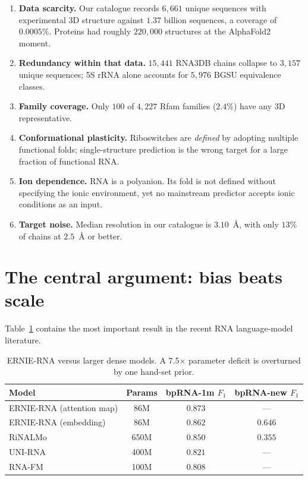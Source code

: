 \documentclass[11pt,a4paper]{article}
\begin{document}
\begin{enumerate}[leftmargin=1.4em,itemsep=0.2em]
\item \textbf{Data scarcity.} Our catalogue records $6{,}661$ unique sequences
with experimental 3D structure against $1.37$ billion sequences, a coverage of
$0.0005\%$. Proteins had roughly $220{,}000$ structures at the AlphaFold2
moment.
\item \textbf{Redundancy within that data.} $15{,}441$ RNA3DB chains collapse to
$3{,}157$ unique sequences; 5S rRNA alone accounts for $5{,}976$ BGSU
equivalence classes.
\item \textbf{Family coverage.} Only $100$ of $4{,}227$ Rfam families ($2.4\%$)
have any 3D representative.
\item \textbf{Conformational plasticity.} Riboswitches are \emph{defined} by
adopting multiple functional folds; single-structure prediction is the wrong
target for a large fraction of functional RNA.
\item \textbf{Ion dependence.} RNA is a polyanion. Its fold is not defined
without specifying the ionic environment, yet no mainstream predictor accepts
ionic conditions as an input.
\item \textbf{Target noise.} Median resolution in our catalogue is $3.10$~\AA{},
with only $13\%$ of chains at $2.5$~\AA{} or better.
\end{enumerate}

\section{The central argument: bias beats scale}

Table~\ref{tab:ernie} contains the most important result in the recent RNA
language-model literature.

\begin{table}[h]
\centering
\caption{ERNIE-RNA versus larger dense models. A 7.5$\times$ parameter deficit
is overturned by one hand-set prior.}
\label{tab:ernie}
\begin{tabular}{lccc}
\toprule
\textbf{Model} & \textbf{Params} & \textbf{bpRNA-1m $F_1$} & \textbf{bpRNA-new $F_1$} \\
\midrule
ERNIE-RNA (attention map) & 86M  & $\mathbf{0.873}$ & --- \\
ERNIE-RNA (embedding)     & 86M  & $0.862$ & $\mathbf{0.646}$ \\
RiNALMo                   & 650M & $0.850$ & $0.355$ \\
UNI-RNA                   & 400M & $0.821$ & --- \\
RNA-FM                    & 100M & $0.808$ & --- \\
\bottomrule
\end{tabular}
\end{table}
\end{document}
